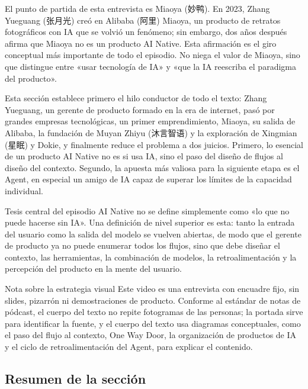 \documentclass[a4paper]{article}
\begin{document}
El punto de partida de esta entrevista es Miaoya (妙鸭). En 2023, Zhang Yueguang (张月光) creó en Alibaba (阿里) Miaoya, un producto de retratos fotográficos con IA que se volvió un fenómeno; sin embargo, dos años después afirma que Miaoya no es un producto AI Native. Esta afirmación es el giro conceptual más importante de todo el episodio. No niega el valor de Miaoya, sino que distingue entre «usar tecnología de IA» y «que la IA reescriba el paradigma del producto».

Esta sección establece primero el hilo conductor de todo el texto: Zhang Yueguang, un gerente de producto formado en la era de internet, pasó por grandes empresas tecnológicas, un primer emprendimiento, Miaoya, su salida de Alibaba, la fundación de Muyan Zhiyu (沐言智语) y la exploración de Xingmian (星眠) y Dokie, y finalmente reduce el problema a dos juicios. Primero, lo esencial de un producto AI Native no es si usa IA, sino el paso del diseño de flujos al diseño del contexto. Segundo, la apuesta más valiosa para la siguiente etapa es el Agent, en especial un amigo de IA capaz de superar los límites de la capacidad individual.

\begin{importantbox}{Tesis central del episodio}
AI Native no se define simplemente como «lo que no puede hacerse sin IA». Una definición de nivel superior es esta: tanto la entrada del usuario como la salida del modelo se vuelven abiertas, de modo que el gerente de producto ya no puede enumerar todos los flujos, sino que debe diseñar el contexto, las herramientas, la combinación de modelos, la retroalimentación y la percepción del producto en la mente del usuario.
\end{importantbox}

\begin{knowledgebox}{Nota sobre la estrategia visual}
Este video es una entrevista con encuadre fijo, sin slides, pizarrón ni demostraciones de producto. Conforme al estándar de notas de pódcast, el cuerpo del texto no repite fotogramas de las personas; la portada sirve para identificar la fuente, y el cuerpo del texto usa diagramas conceptuales, como el paso del flujo al contexto, One Way Door, la organización de productos de IA y el ciclo de retroalimentación del Agent, para explicar el contenido.
\end{knowledgebox}

\subsection{Resumen de la sección}
\end{document}
